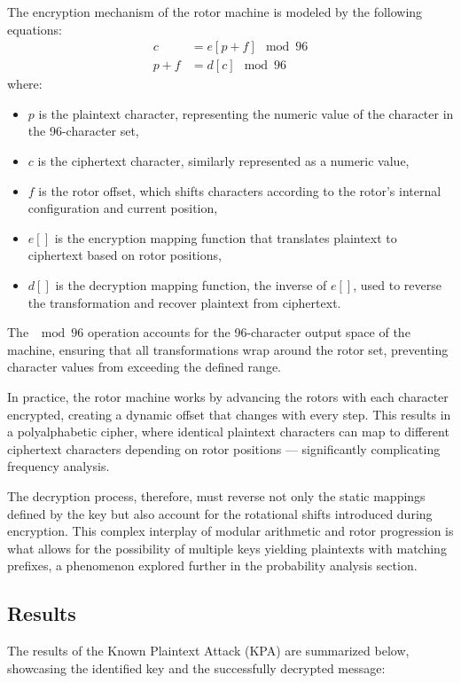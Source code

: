 \documentclass{article}
\begin{document}
The encryption mechanism of the rotor machine is modeled by the following equations:
\begin{align*}
    c &= e[p + f] \mod 96 \\ 
    p + f &= d[c] \mod 96
\end{align*}
where:
\begin{itemize}
    \item \( p \) is the plaintext character, representing the numeric value of the character in the 96-character set,
    \item \( c \) is the ciphertext character, similarly represented as a numeric value,
    \item \( f \) is the rotor offset, which shifts characters according to the rotor's internal configuration and current position,
    \item \( e[] \) is the encryption mapping function that translates plaintext to ciphertext based on rotor positions,
    \item \( d[] \) is the decryption mapping function, the inverse of \( e[] \), used to reverse the transformation and recover plaintext from ciphertext.
\end{itemize}
The \( \mod 96 \) operation accounts for the 96-character output space of the machine, ensuring that all transformations wrap around the rotor set, preventing character values from exceeding the defined range.

In practice, the rotor machine works by advancing the rotors with each character encrypted, creating a dynamic offset that changes with every step. This results in a polyalphabetic cipher, where identical plaintext characters can map to different ciphertext characters depending on rotor positions — significantly complicating frequency analysis.

The decryption process, therefore, must reverse not only the static mappings defined by the key but also account for the rotational shifts introduced during encryption. This complex interplay of modular arithmetic and rotor progression is what allows for the possibility of multiple keys yielding plaintexts with matching prefixes, a phenomenon explored further in the probability analysis section.


\subsection{Results}
The results of the Known Plaintext Attack (KPA) are summarized below, showcasing the identified key and the successfully decrypted message:
\end{document}
